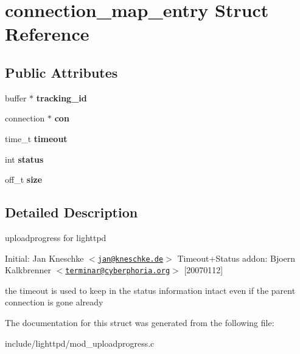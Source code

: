 \hypertarget{structconnection__map__entry}{
\section{connection\_\-map\_\-entry Struct Reference}
\label{structconnection__map__entry}
}
\subsection*{Public Attributes}
\begin{CompactItemize}
\item 
\hypertarget{structconnection__map__entry_9b850dc1eeab1d8c44db1ce3d5dd0365}{
buffer $\ast$ \textbf{tracking\_\-id}}
\label{structconnection__map__entry_9b850dc1eeab1d8c44db1ce3d5dd0365}

\item 
\hypertarget{structconnection__map__entry_32512220136d43a40f2219f87b9689ee}{
connection $\ast$ \textbf{con}}
\label{structconnection__map__entry_32512220136d43a40f2219f87b9689ee}

\item 
\hypertarget{structconnection__map__entry_97413e3f9c37b9d35c0cce27cb68aa2d}{
time\_\-t \textbf{timeout}}
\label{structconnection__map__entry_97413e3f9c37b9d35c0cce27cb68aa2d}

\item 
\hypertarget{structconnection__map__entry_a2c3e39ece01ae70c3edabff7d98ccd5}{
int \textbf{status}}
\label{structconnection__map__entry_a2c3e39ece01ae70c3edabff7d98ccd5}

\item 
\hypertarget{structconnection__map__entry_6c982b1a4aa90aed9e69d2f0504630d5}{
off\_\-t \textbf{size}}
\label{structconnection__map__entry_6c982b1a4aa90aed9e69d2f0504630d5}

\end{CompactItemize}


\subsection{Detailed Description}
uploadprogress for lighttpd

Initial: Jan Kneschke $<$\href{mailto:jan@kneschke.de}{\tt jan@kneschke.de}$>$ Timeout+Status addon: Bjoern Kalkbrenner $<$\href{mailto:terminar@cyberphoria.org}{\tt terminar@cyberphoria.org}$>$ \mbox{[}20070112\mbox{]}

the timeout is used to keep in the status information intact even if the parent connection is gone already 

The documentation for this struct was generated from the following file:\begin{CompactItemize}
\item 
include/lighttpd/mod\_\-uploadprogress.c\end{CompactItemize}
